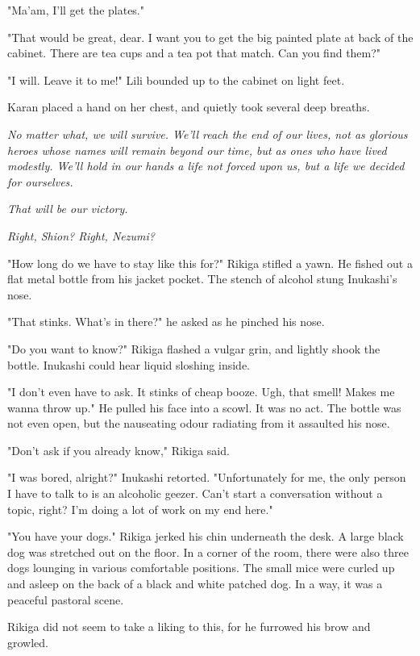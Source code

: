 "Ma'am, I'll get the plates."

"That would be great, dear. I want you to get the big painted plate at
back of the cabinet. There are tea cups and a tea pot that match. Can
you find them?"

"I will. Leave it to me!" Lili bounded up to the cabinet on light feet.~

Karan placed a hand on her chest, and quietly took several deep breaths.

\emph{No matter what, we will survive. We'll reach the end of our lives, not
	as glorious heroes whose names will remain beyond our time, but as ones
	who have lived modestly. We'll hold in our hands a life not forced upon
	us, but a life we decided for ourselves.}

\emph{That will be our victory.}

\emph{Right, Shion? Right, Nezumi?}

\mybreak

"How long do we have to stay like this for?" Rikiga stifled a yawn. He
fished out a flat metal bottle from his jacket pocket. The stench of
alcohol stung Inukashi's nose.

"That stinks. What's in there?" he asked as he pinched his nose.

"Do you want to know?" Rikiga flashed a vulgar grin, and lightly shook
the bottle. Inukashi could hear liquid sloshing inside.

"I don't even have to ask. It stinks of cheap booze. Ugh, that smell!
Makes me wanna throw up." He pulled his face into a scowl. It was no
act. The bottle was not even open, but the nauseating odour radiating
from it assaulted his nose.

"Don't ask if you already know," Rikiga said.

"I was bored, alright?" Inukashi retorted. "Unfortunately for me, the
only person I have to talk to is an alcoholic geezer. Can't start a
conversation without a topic, right? I'm doing a lot of work on my end
here."

"You have your dogs." Rikiga jerked his chin underneath the desk. A
large black dog was stretched out on the floor. In a corner of the room,
there were also three dogs lounging in various comfortable positions.
The small mice were curled up and asleep on the back of a black and
white patched dog. In a way, it was a peaceful pastoral scene.

Rikiga did not seem to take a liking to this, for he furrowed his brow
and growled.


